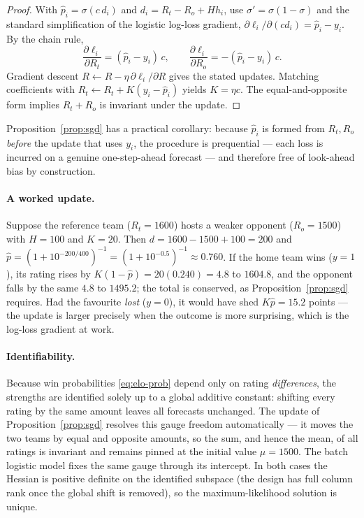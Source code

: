 \documentclass[11pt]{article}
\begin{document}
\begin{proof}
With $\hat p_i = \sigma(c\,d_i)$ and $d_i = R_t - R_o + Hh_i$, use
$\sigma' = \sigma(1-\sigma)$ and the standard simplification of the logistic
log-loss gradient, $\partial \ell_i / \partial (cd_i) = \hat p_i - y_i$. By the
chain rule,
\[
\frac{\partial \ell_i}{\partial R_t}
= (\hat p_i - y_i)\,c, \qquad
\frac{\partial \ell_i}{\partial R_o}
= -(\hat p_i - y_i)\,c .
\]
Gradient descent $R \leftarrow R - \eta\,\partial\ell_i/\partial R$ gives the
stated updates. Matching coefficients with $R_t \leftarrow R_t + K(y_i-\hat p_i)$
yields $K = \eta c$. The equal-and-opposite form implies
$R_t + R_o$ is invariant under the update.
\end{proof}

Proposition~\ref{prop:sgd} has a practical corollary: because $\hat p_i$ is formed
from $R_t,R_o$ \emph{before} the update that uses $y_i$, the procedure is
prequential --- each loss is incurred on a genuine one-step-ahead forecast --- and
therefore free of look-ahead bias by construction.

\paragraph{A worked update.} Suppose the reference team ($R_t = 1600$) hosts a
weaker opponent ($R_o = 1500$) with $H = 100$ and $K = 20$. Then
$d = 1600 - 1500 + 100 = 200$ and
$\hat p = (1 + 10^{-200/400})^{-1} = (1 + 10^{-0.5})^{-1} \approx 0.760$. If the
home team wins ($y=1$), its rating rises by $K(1-\hat p) = 20(0.240) = 4.8$ to
$1604.8$, and the opponent falls by the same $4.8$ to $1495.2$; the total is
conserved, as Proposition~\ref{prop:sgd} requires. Had the favourite \emph{lost}
($y=0$), it would have shed $K\hat p = 15.2$ points --- the update is larger
precisely when the outcome is more surprising, which is the log-loss gradient at
work.

\paragraph{Identifiability.} Because win probabilities \eqref{eq:elo-prob} depend
only on rating \emph{differences}, the strengths are identified solely up to a
global additive constant: shifting every rating by the same amount leaves all
forecasts unchanged. The update of Proposition~\ref{prop:sgd} resolves this gauge
freedom automatically --- it moves the two teams by equal and opposite amounts, so
the sum, and hence the mean, of all ratings is invariant and remains pinned at the
initial value $\mu = 1500$. The batch logistic model fixes the same gauge through
its intercept. In both cases the Hessian is positive definite on the identified
subspace (the design has full column rank once the global shift is removed), so the
maximum-likelihood solution is unique.
\end{document}
